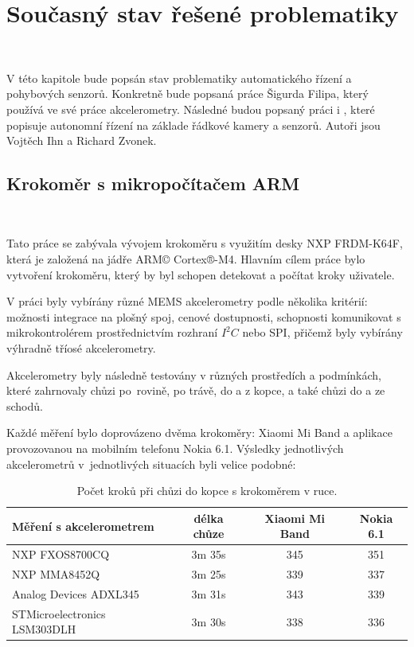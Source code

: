 \chapter{Současný stav řešené problematiky}
\label{sec:Theory}\

V této kapitole bude popsán stav problematiky automatického řízení a pohybových
senzorů. Konkretně bude popsaná práce \cite{krokomer} Šigurda Filipa, který používá ve své práce akcelerometry. Následné
budou popsaný práci \cite{draha} i \cite{robot},
které popisuje autonomní řízení na základe řádkové kamery a senzorů. Autoři jsou
Vojtěch Ihn a Richard Zvonek.

\section{Krokoměr s mikropočítačem ARM}\

Tato práce se zabývala vývojem krokoměru s využitím desky NXP FRDM-K64F, která je
založená na jádře ARM© Cortex®-M4. Hlavním cílem práce bylo vytvoření krokoměru,
který by byl schopen detekovat a počítat kroky uživatele.

V práci byly vybírány různé MEMS akcelerometry podle několika kritérií: možnosti
integrace na plošný spoj, cenové dostupnosti, schopnosti komunikovat s
mikrokontrolérem prostřednictvím rozhraní $I^2C$ nebo SPI, přičemž byly vybírány
výhradně tříosé akcelerometry.

Akcelerometry byly následně testovány v různých prostředích a podmínkách, které
zahrnovaly chůzi po~rovině, po trávě, do a z kopce, a také chůzi do a ze schodů.

Každé měření bylo doprovázeno dvěma krokoměry:  Xiaomi Mi Band a aplikace
 provozovanou na mobilním telefonu Nokia 6.1. Výsledky jednotlivých
akcelerometrů v~jednotlivých situacích byli velice podobné:

\begin{table}[!h]
	\centering
	\begin{tabular}{lccc}
		\toprule
		Měření s akcelerometrem      & délka chůze & Xiaomi Mi Band & Nokia 6.1 \\
		\midrule
		NXP FXOS8700CQ               & 3m 35s      & 345            & 351       \\
		NXP MMA8452Q                 & 3m 25s      & 339            & 337       \\
		Analog Devices ADXL345       & 3m 31s      & 343            & 339       \\
		STMicroelectronics LSM303DLH & 3m 30s      & 338            & 336       \\
		\bottomrule
	\end{tabular}
	\caption{Počet kroků při chůzi do kopce s krokoměrem v ruce\cite{krokomer}.}
	\label{tab:1}
\end{table}

